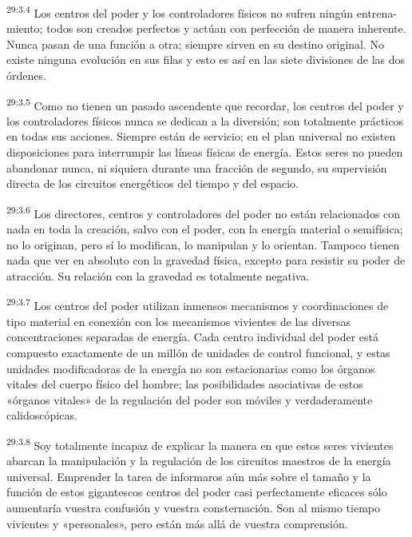 \par
\textsuperscript{29:3.4} Los centros del poder y los controladores físicos no sufren ningún entrena-miento; todos son creados perfectos y actúan con perfección de manera inherente. Nunca pasan de una función a otra; siempre sirven en su destino original. No existe ninguna evolución en sus filas y esto es así en las siete divisiones de las dos órdenes.

\par
\textsuperscript{29:3.5} Como no tienen un pasado ascendente que recordar, los centros del poder y los controladores físicos nunca se dedican a la diversión; son totalmente prácticos en todas sus acciones. Siempre están de servicio; en el plan universal no existen disposiciones para interrumpir las líneas físicas de energía. Estos seres no pueden abandonar nunca, ni siquiera durante una fracción de segundo, su supervisión directa de los circuitos energéticos del tiempo y del espacio.

\par
\textsuperscript{29:3.6} Los directores, centros y controladores del poder no están relacionados con nada en toda la creación, salvo con el poder, con la energía material o semifísica; no lo originan, pero sí lo modifican, lo manipulan y lo orientan. Tampoco tienen nada que ver en absoluto con la gravedad física, excepto para resistir su poder de atracción. Su relación con la gravedad es totalmente negativa.

\par
\textsuperscript{29:3.7} Los centros del poder utilizan inmensos mecanismos y coordinaciones de tipo material en conexión con los mecanismos vivientes de las diversas concentraciones separadas de energía. Cada centro individual del poder está compuesto exactamente de un millón de unidades de control funcional, y estas unidades modificadoras de la energía no son estacionarias como los órganos vitales del cuerpo físico del hombre; las posibilidades asociativas de estos «órganos vitales» de la regulación del poder son móviles y verdaderamente calidoscópicas.

\par
\textsuperscript{29:3.8} Soy totalmente incapaz de explicar la manera en que estos seres vivientes abarcan la manipulación y la regulación de los circuitos maestros de la energía universal. Emprender la tarea de informaros aún más sobre el tamaño y la función de estos gigantescos centros del poder casi perfectamente eficaces sólo aumentaría vuestra confusión y vuestra consternación. Son al mismo tiempo vivientes y «personales», pero están más allá de vuestra comprensión.

